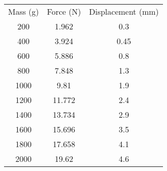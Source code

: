 \begin{table}[]
	\begin{tabular}{ccc}
		Mass (g) & Force (N) & Displacement (mm) \\
		200      & 1.962     & 0.3               \\
		400      & 3.924     & 0.45              \\
		600      & 5.886     & 0.8               \\
		800      & 7.848     & 1.3               \\
		1000     & 9.81      & 1.9               \\
		1200     & 11.772    & 2.4               \\
		1400     & 13.734    & 2.9               \\
		1600     & 15.696    & 3.5               \\
		1800     & 17.658    & 4.1               \\
		2000     & 19.62     & 4.6
	\end{tabular}
\end{table}